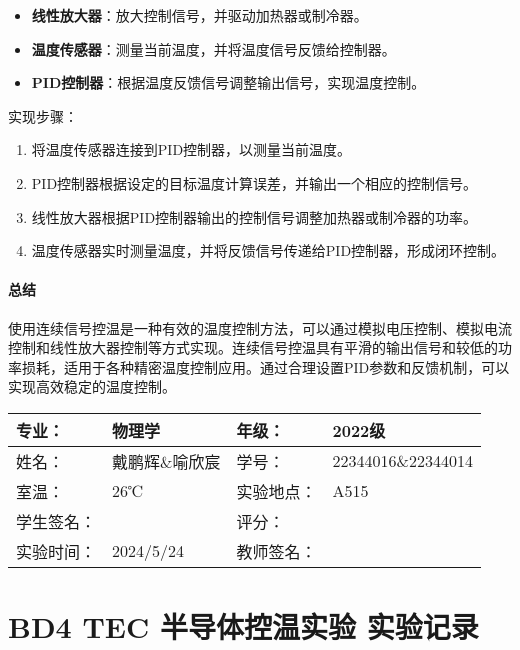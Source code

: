 \documentclass[dvipsnames, svgnames,a4paper,11pt]{article}
\begin{document}
\begin{itemize}
    \item \textbf{线性放大器}：放大控制信号，并驱动加热器或制冷器。
    \item \textbf{温度传感器}：测量当前温度，并将温度信号反馈给控制器。
    \item \textbf{PID控制器}：根据温度反馈信号调整输出信号，实现温度控制。
\end{itemize}

实现步骤：

\begin{enumerate}
    \item 将温度传感器连接到PID控制器，以测量当前温度。
    \item PID控制器根据设定的目标温度计算误差，并输出一个相应的控制信号。
    \item 线性放大器根据PID控制器输出的控制信号调整加热器或制冷器的功率。
    \item 温度传感器实时测量温度，并将反馈信号传递给PID控制器，形成闭环控制。
\end{enumerate}


\paragraph*{总结}

使用连续信号控温是一种有效的温度控制方法，可以通过模拟电压控制、模拟电流控制和线性放大器控制等方式实现。连续信号控温具有平滑的输出信号和较低的功率损耗，适用于各种精密温度控制应用。通过合理设置PID参数和反馈机制，可以实现高效稳定的温度控制。







\clearpage
\begin{table}
	\renewcommand\arraystretch{1.7}
	\centering
	\begin{tabularx}{\textwidth}{|X|X|X|X|}
	\hline
	专业：& 物理学 &年级：& 2022级 \\
	\hline
	姓名：& 戴鹏辉\&喻欣宸 & 学号：& 22344016\&22344014 \\
	\hline
	室温：& 26℃ & 实验地点： & A515 \\
	\hline
	学生签名：& & 评分： &\\
	\hline
	实验时间：& 2024/5/24 & 教师签名：&\\
	\hline
	\end{tabularx}
\end{table}

\section{BD4 \quad TEC 半导体控温实验 \quad\heiti 实验记录}
\end{document}

